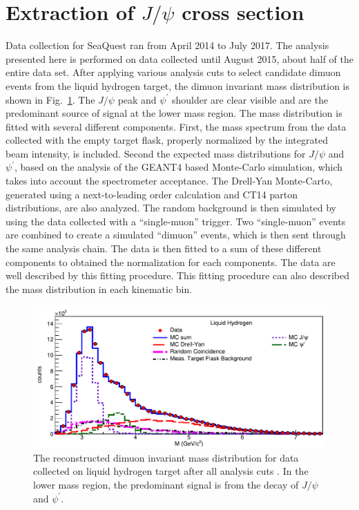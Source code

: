 \documentclass[10pt,a4paper,final]{article}
\begin{document}
\section{Extraction of \texorpdfstring{$J/\psi$}{J/psi} cross section}
\label{sec:result}
Data collection for SeaQuest ran from April 2014 to July 2017. The analysis
presented here is performed on data collected until August 2015, about half
of the entire data set. After applying various analysis cuts to select
candidate dimuon events from the liquid hydrogen target, the dimuon invariant
mass distribution is shown in Fig.~\ref{fig:mass}. The $J/\psi$ peak and $\psi^\prime$
shoulder are clear visible and are the predominant source of signal at the 
lower mass region. The mass distribution is fitted with several different
components. First, the mass spectrum from the data collected with the 
empty target flask, properly normalized by the integrated beam intensity,
is included. Second the expected mass distributions for $J/\psi$ and 
$\psi^\prime$, based on the analysis of the GEANT4 based Monte-Carlo
simulation, which takes into account the spectrometer acceptance. The Drell-Yan
Monte-Carto, generated using a next-to-leading order calculation and CT14 parton
distributions, are also analyzed. The random background is then simulated by
using the data collected with a ``single-muon'' trigger. Two ``single-muon''
events are combined to create a simulated ``dimuon'' events, which is then sent
through the same analysis chain. The data is then fitted to a sum of these
different components to obtained the normalization for each components. The
data are well described by this fitting procedure. This fitting procedure
can also described the mass distribution in each kinematic bin.

\begin{figure}[htbp!]
	\centering
	\includegraphics[width=0.65\linewidth]{extFig3_LH2}
	\caption{The reconstructed dimuon invariant mass distribution for data collected on
		liquid hydrogen target after all analysis cuts \cite{dove2021}.
		In the lower mass region, the predominant signal is from the decay
		of $J/\psi$ and $\psi^\prime$. }
	\label{fig:mass}
\end{figure}
\end{document}
